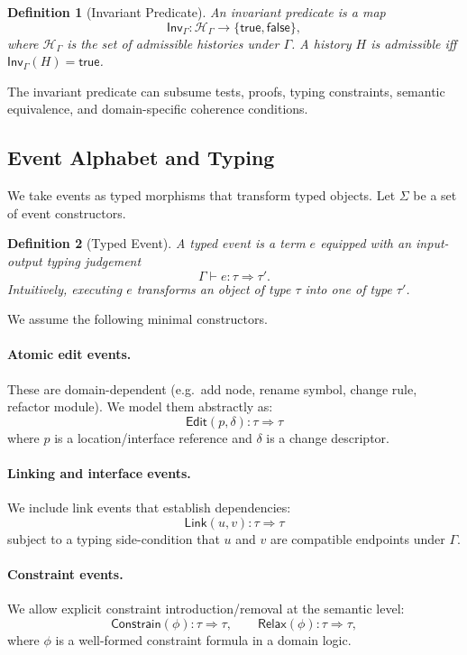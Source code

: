 \documentclass[11pt]{article}
\newtheorem{definition}{Definition}
\begin{document}
\begin{definition}[Invariant Predicate]
An \emph{invariant predicate} is a map
\[
\mathsf{Inv}_\Gamma : \mathcal{H}_\Gamma \to \{\mathsf{true},\mathsf{false}\},
\]
where $\mathcal{H}_\Gamma$ is the set of admissible histories under $\Gamma$. A history $H$ is \emph{admissible} iff $\mathsf{Inv}_\Gamma(H)=\mathsf{true}$.
\end{definition}

The invariant predicate can subsume tests, proofs, typing constraints, semantic equivalence, and domain-specific coherence conditions.

\subsection{Event Alphabet and Typing}

We take events as typed morphisms that transform typed objects. Let $\Sigma$ be a set of event constructors.

\begin{definition}[Typed Event]
A \emph{typed event} is a term $e$ equipped with an input-output typing judgement
\[
\Gamma \vdash e : \tau \Rightarrow \tau'.
\]
Intuitively, executing $e$ transforms an object of type $\tau$ into one of type $\tau'$.
\end{definition}

We assume the following minimal constructors.

\paragraph{Atomic edit events.}
These are domain-dependent (e.g.\ add node, rename symbol, change rule, refactor module). We model them abstractly as:
\[
\mathsf{Edit}(p,\delta) : \tau \Rightarrow \tau
\]
where $p$ is a location/interface reference and $\delta$ is a change descriptor.

\paragraph{Linking and interface events.}
We include link events that establish dependencies:
\[
\mathsf{Link}(u,v) : \tau \Rightarrow \tau
\]
subject to a typing side-condition that $u$ and $v$ are compatible endpoints under $\Gamma$.

\paragraph{Constraint events.}
We allow explicit constraint introduction/removal at the semantic level:
\[
\mathsf{Constrain}(\phi) : \tau \Rightarrow \tau,
\qquad
\mathsf{Relax}(\phi) : \tau \Rightarrow \tau,
\]
where $\phi$ is a well-formed constraint formula in a domain logic.
\end{document}
